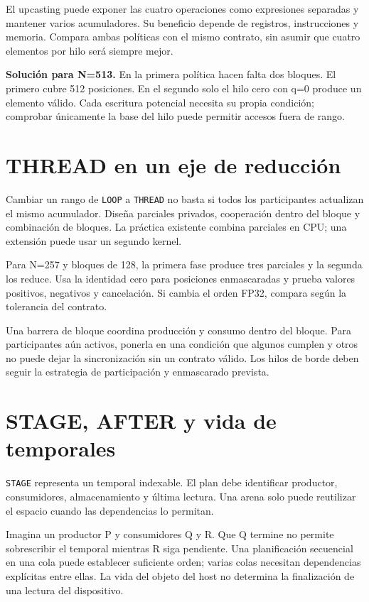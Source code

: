\documentclass[12pt,a4paper,oneside]{report}
\begin{document}
El upcasting puede exponer las cuatro operaciones como expresiones separadas y mantener varios acumuladores. Su beneficio depende de registros, instrucciones y memoria. Compara ambas políticas con el mismo contrato, sin asumir que cuatro elementos por hilo será siempre mejor.

\textbf{Solución para N=513.} En la primera política hacen falta dos bloques. El primero cubre 512 posiciones. En el segundo solo el hilo cero con q=0 produce un elemento válido. Cada escritura potencial necesita su propia condición; comprobar únicamente la base del hilo puede permitir accesos fuera de rango.

\section{THREAD en un eje de reducción}
Cambiar un rango de \texttt{LOOP} a \texttt{THREAD} no basta si todos los participantes actualizan el mismo acumulador. Diseña parciales privados, cooperación dentro del bloque y combinación de bloques. La práctica existente combina parciales en CPU; una extensión puede usar un segundo kernel.

Para N=257 y bloques de 128, la primera fase produce tres parciales y la segunda los reduce. Usa la identidad cero para posiciones enmascaradas y prueba valores positivos, negativos y cancelación. Si cambia el orden FP32, compara según la tolerancia del contrato.

Una barrera de bloque coordina producción y consumo dentro del bloque. Para participantes aún activos, ponerla en una condición que algunos cumplen y otros no puede dejar la sincronización sin un contrato válido. Los hilos de borde deben seguir la estrategia de participación y enmascarado prevista. \cite{cuda-guide}

\section{STAGE, AFTER y vida de temporales}
\texttt{STAGE} representa un temporal indexable. El plan debe identificar productor, consumidores, almacenamiento y última lectura. Una arena solo puede reutilizar el espacio cuando las dependencias lo permitan.

Imagina un productor P y consumidores Q y R. Que Q termine no permite sobrescribir el temporal mientras R siga pendiente. Una planificación secuencial en una cola puede establecer suficiente orden; varias colas necesitan dependencias explícitas entre ellas. La vida del objeto del host no determina la finalización de una lectura del dispositivo.
\end{document}
